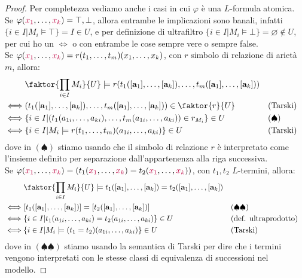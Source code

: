 \begin{proof}
        Per completezza vediamo anche i casi in cui $\varphi$ è una $L$-formula atomica.\\
        Se $\varphi(\textcolor{purple}{x_1},\ldots,\textcolor{purple}{x_k}) = \top, \bot$, allora entrambe le implicazioni sono banali, infatti $\{i \in I | M_i \models \top\} = I \in U$, e per definizione di ultrafiltro $\{i \in I | M_i \models \bot\} = \varnothing \notin U$, per cui ho un $\iff$ o con entrambe le cose sempre vere o sempre false.\\
        Se $\varphi(\textcolor{purple}{x_1},\ldots,\textcolor{purple}{x_k}) = r(t_1,\ldots,t_m)(x_1,\ldots,x_k)$, con $r$ simbolo di relazione di arietà $m$, allora:
        \begin{align*}
            &\faktor{\prod_{i \in I} M_i}{U} \models r(t_1([\mathbf a_1],\ldots,[\mathbf a_k]),\ldots,t_m([\mathbf a_1],\ldots,[\mathbf a_k])) \\
            \iff& (t_1([\mathbf a_1],\ldots,[\mathbf a_k]),\ldots,t_m([\mathbf a_1],\ldots,[\mathbf a_k])) \in \faktor{r}{U} && \text{(Tarski)}\\
            \iff& \{i \in I | (t_1(a_{1i},\ldots,a_{ki}),\ldots,t_m(a_{1i},\ldots,a_{ki})) \in r_{M_i}\} \in U && (\spadesuit) \\
            \iff& \{i \in I | M_i \models r(t_1,\ldots,t_m)(a_{1i},\ldots,a_{ki})\} \in U && \text{(Tarski)}
        \end{align*}
        dove in $(\spadesuit)$ stiamo usando che il simbolo di relazione $r$ è interpretato come l'insieme definito per separazione dall'appartenenza alla riga successiva.\\
        Se $\varphi(\textcolor{purple}{x_1},\ldots,\textcolor{purple}{x_k}) = (t_1(\textcolor{purple}{x_1},\ldots,\textcolor{purple}{x_k}) = t_2(\textcolor{purple}{x_1},\ldots,\textcolor{purple}{x_k}))$, con $t_1,t_2$ $L$-termini, allora:
        \begin{align*}
            &\faktor{\prod_{i \in I} M_i}{U} \models t_1([\mathbf a_1],\ldots,[\mathbf a_k]) = t_2([\mathbf a_1],\ldots,[\mathbf a_k]) \\
            \iff& [t_1([\mathbf a_1],\ldots,[\mathbf a_k])] = [t_2([\mathbf a_1],\ldots,[\mathbf a_k])] && (\spadesuit\spadesuit)\\
            \iff& \{i \in I | t_1(a_{1i},\ldots,a_{ki}) = t_2(a_{1i},\ldots,a_{ki})\} \in U && \text{(def. ultraprodotto)}\\
            \iff& \{i \in I | M_i \models (t_1 = t_2)(a_{1i},\ldots,a_{ki})\} \in U && \text{(Tarski)}
        \end{align*}
        dove in $(\spadesuit\spadesuit)$ stiamo usando la semantica di Tarski per dire che i termini vengono interpretati con le stesse classi di equivalenza di successioni nel modello.
\end{proof}

